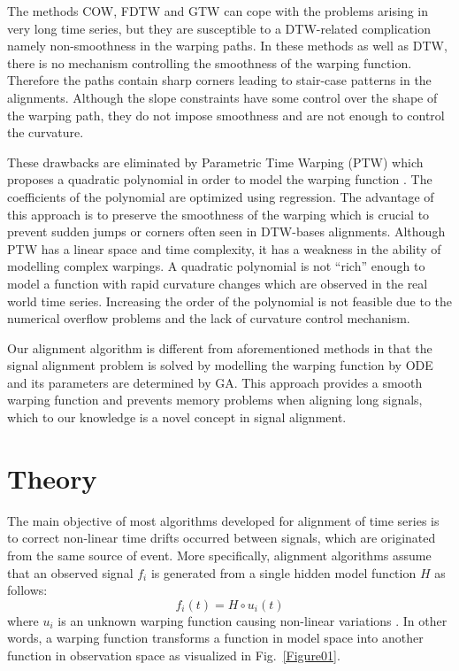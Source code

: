 \documentclass[number,1p,12pt]{elsarticle}
\begin{document}
The methods COW, FDTW and GTW can cope with the problems arising in very long time series, but they are susceptible to a DTW-related complication namely non-smoothness in the warping paths. In these methods as well as DTW, there is no mechanism controlling the smoothness of the warping function. Therefore the paths contain sharp corners leading to stair-case patterns in the alignments. Although the slope constraints have some control over the shape of the warping path, they do not impose smoothness and are not enough to control the curvature.

These drawbacks are eliminated by Parametric Time Warping (PTW) which proposes a quadratic polynomial in order to model the warping function \cite{Eilers2004}. The coefficients of the polynomial are optimized using regression. The advantage of this approach is to preserve the smoothness of the warping which is crucial to prevent sudden jumps or corners often seen in DTW-bases alignments. Although PTW has a linear space and time complexity,  it has a weakness in the ability of modelling complex warpings. A quadratic polynomial is not ``rich'' enough to model a function with rapid curvature changes which are observed in the real world time series. Increasing the order of the polynomial is not feasible due to the numerical overflow problems and the lack of curvature control mechanism. 

Our alignment algorithm is different from aforementioned methods in that the signal alignment problem is solved by modelling the warping function by ODE and its parameters are determined by GA. This approach provides a smooth warping function and prevents memory problems when aligning long signals, which to our knowledge is a novel concept in signal alignment.

\section{Theory}
The main objective of most algorithms developed for alignment of time series is to correct non-linear time drifts occurred between signals, which are originated from the same source of event. More specifically, alignment algorithms assume that an observed signal $f_i$ is generated from a single hidden model function $H$ as follows:
\begin{equation}
 f_i(t)=H \circ u_i (t)
\end{equation}
where $u_i$ is an unknown warping function causing non-linear variations \cite{Ramsay1998a}. In other words, a warping function transforms a function in model space into another function in observation space as visualized in Fig.~\ref{Figure01}. 
\end{document}
